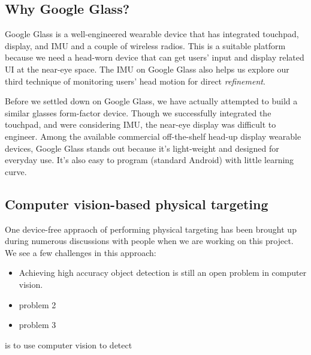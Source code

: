 \subsection{Why Google Glass?}
\label{sec:using-google-glass}
Google Glass is a well-engineered wearable device that has integrated touchpad, display, and IMU and a couple of wireless radios. This is a suitable platform because we need a head-worn device that can get users' input and display related UI at the near-eye space. The IMU on Google Glass also helps us explore our third technique of monitoring users' head motion for direct {\em refinement}. 

Before we settled down on Google Glass, we have actually attempted to build a similar glasses form-factor device. Though we successfully integrated the touchpad, and were considering IMU, the near-eye display was difficult to engineer. Among the available commercial off-the-shelf head-up display wearable devices, Google Glass stands out because it's light-weight and designed for everyday use. It's also easy to program (standard Android) with little learning curve.

\subsection{Computer vision-based physical targeting}
\label{sec:comp-visi-based}
One device-free appraoch of performing physical targeting has been brought up during numerous discussions with people when we are working on this project. We see a few challenges in this approach:
\begin{itemize}
\item Achieving high accuracy object detection is still an open problem in computer vision. 
\item problem 2
\item problem 3
\end{itemize}

is to use computer vision to detect 

